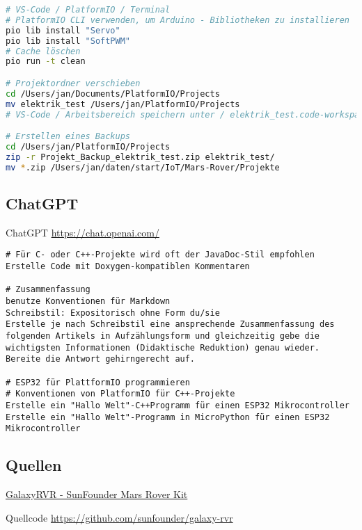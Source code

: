 \documentclass{vorlage-design-main}
\begin{document}
\begin{lstlisting}[language=bash]
# VS-Code / PlatformIO / Terminal
# PlatformIO CLI verwenden, um Arduino - Bibliotheken zu installieren
pio lib install "Servo"
pio lib install "SoftPWM"
# Cache löschen
pio run -t clean

# Projektordner verschieben
cd /Users/jan/Documents/PlatformIO/Projects
mv elektrik_test /Users/jan/PlatformIO/Projects
# VS-Code / Arbeitsbereich speichern unter / elektrik_test.code-workspace + Alias erstellen

# Erstellen eines Backups
cd /Users/jan/PlatformIO/Projects
zip -r Projekt_Backup_elektrik_test.zip elektrik_test/
mv *.zip /Users/jan/daten/start/IoT/Mars-Rover/Projekte
\end{lstlisting}

\hypertarget{chatgpt}{%
\subsection{ChatGPT}\label{chatgpt}}

ChatGPT \url{https://chat.openai.com/}

\begin{lstlisting}
# Für C- oder C++-Projekte wird oft der JavaDoc-Stil empfohlen
Erstelle Code mit Doxygen-kompatiblen Kommentaren

# Zusammenfassung
benutze Konventionen für Markdown
Schreibstil: Expositorisch ohne Form du/sie
Erstelle je nach Schreibstil eine ansprechende Zusammenfassung des folgenden Artikels in Aufzählungsform und gleichzeitig gebe die wichtigsten Informationen (Didaktische Reduktion) genau wieder. Bereite die Antwort gehirngerecht auf.

# ESP32 für PlattformIO programmieren
# Konventionen von PlatformIO für C++-Projekte
Erstelle ein "Hallo Welt"-C++Programm für einen ESP32 Mikrocontroller 
Erstelle ein "Hallo Welt"-Programm in MicroPython für einen ESP32 Mikrocontroller 
\end{lstlisting}

\hypertarget{quellen}{%
\subsection{Quellen}\label{quellen}}

\href{https://docs.sunfounder.com/projects/galaxy-rvr/de/latest/index.html}{GalaxyRVR
- SunFounder Mars Rover Kit}

Quellcode \url{https://github.com/sunfounder/galaxy-rvr}
\end{document}
